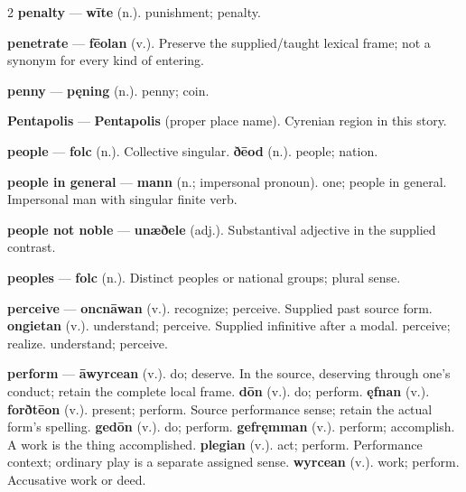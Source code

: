 \begin{multicols}{2}
\textbf{penalty} — \textbf{wīte} (n.). punishment; penalty.\par
\textbf{penetrate} — \textbf{fēolan} (v.). Preserve the supplied/taught lexical frame; not a synonym for every kind of entering.\par
\textbf{penny} — \textbf{pęning} (n.). penny; coin.\par
\textbf{Pentapolis} — \textbf{Pentapolis} (proper place name). Cyrenian region in this story.\par
\textbf{people} — \textbf{folc} (n.). Collective singular. \textbf{ðēod} (n.). people; nation.\par
\textbf{people in general} — \textbf{mann} (n.; impersonal pronoun). one; people in general. Impersonal man with singular finite verb.\par
\textbf{people not noble} — \textbf{unæðele} (adj.). Substantival adjective in the supplied contrast.\par
\textbf{peoples} — \textbf{folc} (n.). Distinct peoples or national groups; plural sense.\par
\textbf{perceive} — \textbf{oncnāwan} (v.). recognize; perceive. Supplied past source form. \textbf{ongietan} (v.). understand; perceive. Supplied infinitive after a modal. perceive; realize. understand; perceive.\par
\textbf{perform} — \textbf{āwyrcean} (v.). do; deserve. In the source, deserving through one's conduct; retain the complete local frame. \textbf{dōn} (v.). do; perform. \textbf{ęfnan} (v.).  \textbf{forðtēon} (v.). present; perform. Source performance sense; retain the actual form's spelling. \textbf{gedōn} (v.). do; perform. \textbf{gefręmman} (v.). perform; accomplish. A work is the thing accomplished. \textbf{plegian} (v.). act; perform. Performance context; ordinary play is a separate assigned sense. \textbf{wyrcean} (v.). work; perform. Accusative work or deed.\par

\end{multicols}
